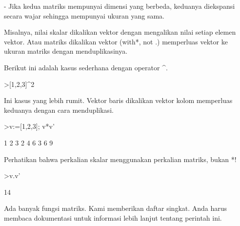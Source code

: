 \documentclass{article}
\begin{document}
\begin{eulernotebook}
\begin{eulercomment}
\begin{eulercomment}
\begin{eulercomment}
\begin{eulercomment}
\begin{eulercomment}
\begin{eulercomment}
\begin{eulercomment}
- Jika kedua matriks mempunyai dimensi yang berbeda, keduanya
diekspansi secara wajar sehingga mempunyai ukuran yang sama.

Misalnya, nilai skalar dikalikan vektor dengan mengalikan nilai setiap
elemen vektor. Atau matriks dikalikan vektor (with*, not .) memperluas
vektor ke ukuran matriks dengan menduplikasinya.

Berikut ini adalah kasus sederhana dengan operator \textasciicircum{}.
\end{eulercomment}
\begin{eulerprompt}
>[1,2,3]^2
\end{eulerprompt}
\begin{euleroutput}
  [1,  4,  9]
\end{euleroutput}
\begin{eulercomment}
Ini kasus yang lebih rumit. Vektor baris dikalikan vektor kolom
memperluas keduanya dengan cara menduplikasi.
\end{eulercomment}
\begin{eulerprompt}
>v:=[1,2,3]; v*v'
\end{eulerprompt}
\begin{euleroutput}
              1             2             3 
              2             4             6 
              3             6             9 
\end{euleroutput}
\begin{eulercomment}
Perhatikan bahwa perkalian skalar menggunakan perkalian matriks, bukan
*!
\end{eulercomment}
\begin{eulerprompt}
>v.v'
\end{eulerprompt}
\begin{euleroutput}
  14
\end{euleroutput}
\begin{eulercomment}
Ada banyak fungsi matriks. Kami memberikan daftar singkat. Anda harus
membaca dokumentasi untuk informasi lebih lanjut tentang perintah ini.


\end{eulercomment}
\end{eulercomment}
\end{eulercomment}
\end{eulercomment}
\end{eulercomment}
\end{eulercomment}
\end{eulercomment}
\end{eulernotebook}
\end{document}
